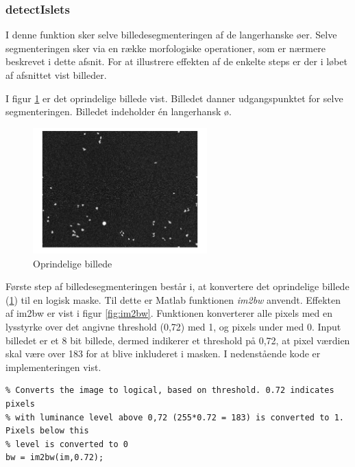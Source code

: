 \newpage
\subsubsection{detectIslets}
\label{subsub:IMdetectIslets}
I denne funktion sker selve billedesegmenteringen af de langerhanske øer. Selve segmenteringen sker via en række morfologiske operationer, som er nærmere beskrevet i dette afsnit. For at illustrere effekten af de enkelte steps er der i løbet af afsnittet vist billeder.

I figur \ref{fig:im} er det oprindelige billede vist. Billedet danner udgangspunktet for selve segmenteringen. Billedet indeholder én langerhansk ø. 


\begin{figure}[H]
	\centering
	\includegraphics[width=0.6\textwidth]{billeder/software/im.png}
	\caption{Oprindelige billede}
	\label{fig:im}
\end{figure}

Første step af billedesegmenteringen består i, at konvertere det oprindelige billede (\ref{fig:im}) til en logisk maske. Til dette er Matlab funktionen \textit{im2bw} anvendt. 
Effekten af im2bw er vist i figur \ref{fig:im2bw}. Funktionen konverterer alle pixels med en lysstyrke over det angivne threshold (0,72) med 1, og pixels under med 0. Input billedet er et 8 bit billede, dermed indikerer et threshold på 0,72, at pixel værdien skal være over 183 for at blive inkluderet i masken. I nedenstående kode er implementeringen vist.

\begin{lstlisting} 
% Converts the image to logical, based on threshold. 0.72 indicates pixels
% with luminance level above 0,72 (255*0.72 = 183) is converted to 1. Pixels below this 
% level is converted to 0 
bw = im2bw(im,0.72);
\end{lstlisting} 

